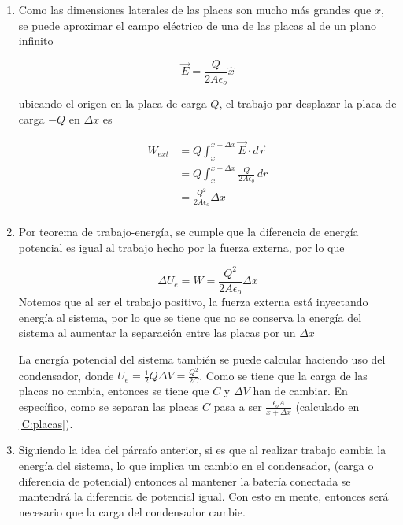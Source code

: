 \begin{enumerate}[label=\alph*)]
    \item Como las dimensiones laterales de las placas son mucho más grandes que $x$, se puede aproximar el campo eléctrico de una de las placas al de un plano infinito

    \[\Vec{E} = \frac{Q}{2A\epsilon_o}\hat{x}\]

    ubicando el origen en la placa de carga $Q$, el trabajo par desplazar la placa de carga $-Q$ en $\Delta x$ es

    \begin{equation}
        \begin{split}
            W_{ext} &= Q\int^{x+\Delta x}_x \Vec{E}\cdot d\Vec{r}\\
            & = Q\int^{x+\Delta x}_x\frac{Q}{2A\epsilon_o}\,dr\\
            & = \frac{Q^2}{2A\epsilon_o}\Delta x\\
        \end{split}
        \nonumber
    \end{equation}
    \medbreak
    \item Por teorema de trabajo-energía, se cumple que la diferencia de energía potencial es igual al trabajo hecho por la fuerza externa, por lo que

    \[\Delta U_e = W = \frac{Q^2}{2A\epsilon_o}\Delta x\]
    Notemos que al ser el trabajo positivo, la fuerza externa está inyectando energía al sistema, por lo que se tiene que no se conserva la energía del sistema al aumentar la separación entre las placas por un $\Delta x$
    
    La energía potencial del sistema también se puede calcular haciendo uso del condensador, donde $U_e = \frac{1}{2}Q\Delta V = \frac{Q^2}{2C}$. Como se tiene que la carga de las placas no cambia, entonces se tiene que $C$ y $\Delta V$ han de cambiar. En específico, como se separan las placas $C$ pasa a ser $\frac{\epsilon_o A}{x+\Delta x}$ (calculado en \ref{C:placas}).
    \item Siguiendo la idea del párrafo anterior, si es que al realizar trabajo cambia la energía del sistema, lo que implica un cambio en el condensador, (carga o diferencia de potencial) entonces al mantener la batería conectada se mantendrá la diferencia de potencial igual. Con esto en mente, entonces será necesario que la carga del condensador cambie.
    

\end{enumerate}

